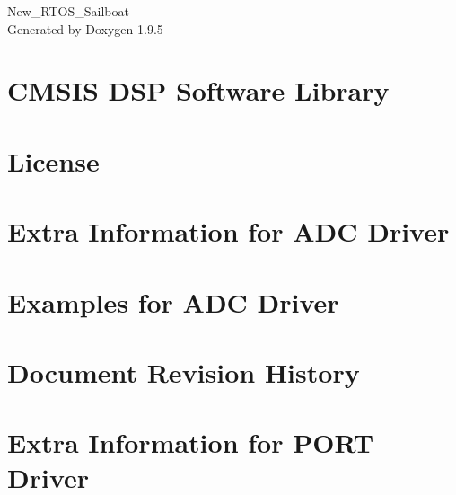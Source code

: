 \documentclass[twoside]{book}
\newcommand{\+}{\discretionary{\mbox{\scriptsize$\hookleftarrow$}}{}{}}
\newcommand{\clearemptydoublepage}{%
    \newpage{\pagestyle{empty}\cleardoublepage}%
  }
\begin{document}
  \raggedbottom
    \hypersetup{pageanchor=false,
                bookmarksnumbered=true,
                pdfencoding=unicode
               }
  \begin{titlepage}
  \vspace*{7cm}
  \begin{center}%
  {\Large New\+\_\+\+RTOS\+\_\+\+Sailboat}\\
  \vspace*{1cm}
  {\large Generated by Doxygen 1.9.5}\\
  \end{center}
  \end{titlepage}
  \clearemptydoublepage
  \tableofcontents
  \clearemptydoublepage
  \hypersetup{pageanchor=true}
\chapter{CMSIS DSP Software Library}
\label{index}\hypertarget{index}{}
\chapter{License}
\label{_license}

\chapter{Extra Information for ADC Driver}
\label{asfdoc_sam0_adc_extra}

\chapter{Examples for ADC Driver}
\label{asfdoc_sam0_adc_exqsg}

\chapter{Document Revision History}
\label{asfdoc_sam0_adc_document_revision_history}

\chapter{Extra Information for PORT Driver}
\label{asfdoc_sam0_port_extra}

\end{document}
